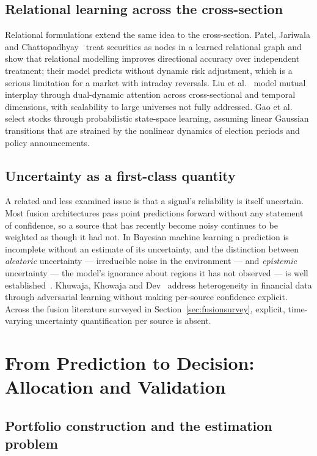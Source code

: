 \subsection{Relational learning across the cross-section}

Relational formulations extend the same idea to the cross-section. Patel, Jariwala and
Chattopadhyay~\cite{patel2024hybrid} treat securities as nodes in a learned relational graph and
show that relational modelling improves directional accuracy over independent treatment; their
model predicts without dynamic risk adjustment, which is a serious limitation for a market with
intraday reversals. Liu et al.~\cite{liu2024heterogeneous} model mutual interplay through
dual-dynamic attention across cross-sectional and temporal dimensions, with scalability to large
universes not fully addressed. Gao et al.~\cite{gao2025relational} select stocks through
probabilistic state-space learning, assuming linear Gaussian transitions that are strained by
the nonlinear dynamics of election periods and policy announcements.

\subsection{Uncertainty as a first-class quantity}

A related and less examined issue is that a signal's reliability is itself uncertain. Most
fusion architectures pass point predictions forward without any statement of confidence, so a
source that has recently become noisy continues to be weighted as though it had not. In Bayesian
machine learning a prediction is incomplete without an estimate of its uncertainty, and the
distinction between \emph{aleatoric} uncertainty --- irreducible noise in the environment ---
and \emph{epistemic} uncertainty --- the model's ignorance about regions it has not observed ---
is well established~\cite{gal2016dropout,kendall2017}. Khuwaja, Khowaja and
Dev~\cite{khuwaja2023} address heterogeneity in financial data through adversarial learning
without making per-source confidence explicit. Across the fusion literature surveyed in
Section~\ref{sec:fusionsurvey}, explicit, time-varying uncertainty quantification per source is
absent.

\section{From Prediction to Decision: Allocation and Validation}

\subsection{Portfolio construction and the estimation problem}

